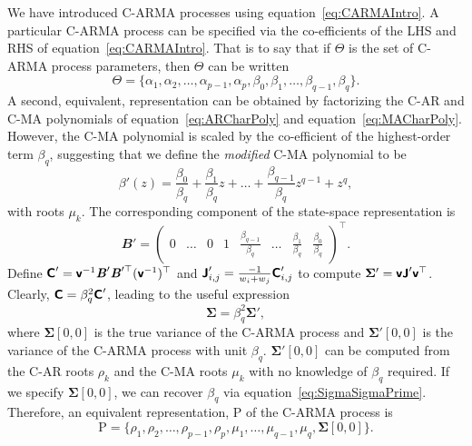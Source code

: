 \documentclass[a4paper,fleqn,usenatbib]{mnras}
\newcommand{\Rho}{\mathrm{P}}
\begin{document}
We have introduced C-ARMA processes using equation~\eqref{eq:CARMAIntro}. A particular C-ARMA process can be specified via the co-efficients of the LHS and RHS of equation~\eqref{eq:CARMAIntro}. That is to say that if $\Theta$ is the set of C-ARMA process parameters, then $\Theta$ can be written
\begin{equation}\label{eq:Theta}
\Theta = \{ \alpha_{1}, \alpha_{2}, \ldots, \alpha_{p-1}, \alpha_{p}, \beta_{0}, \beta_{1}, \ldots, \beta_{q-1}, \beta_{q} \}.
\end{equation}
A second, equivalent, representation can be obtained by factorizing the C-AR and C-MA polynomials of equation~\eqref{eq:ARCharPoly} and equation~\eqref{eq:MACharPoly}. However, the C-MA polynomial is scaled by the co-efficient of the highest-order term $\beta_{q}$, suggesting that we define the \textit{modified} C-MA polynomial to be
\begin{equation}\label{eq:modMACharPoly}
\beta'(z) = \frac{\beta_{0}}{\beta_{q}} + \frac{\beta_{1}}{\beta_{q}} z + \ldots + \frac{\beta_{q-1}}{\beta_{q}} z^{q-1} + z^{q},
\end{equation}
with roots $\mu_{k}$. The corresponding component of the state-space representation is
\begin{equation}\label{eq:BPrime}
\mathbfit{B}' = \left( \begin{array}{cccccccc} 0 & \hdots & 0 & 1 & \frac{\beta_{q-1}}{\beta_{q}} & \hdots & \frac{\beta_{1}}{\beta_{q}} & \frac{\beta_{0}}{\beta_{q}} \end{array} \right)^{\top}.
\end{equation}
Define $\textbf{\textsf{C}}' = \textbf{\textsf{v}}^{-1}\textbf{\textit{B}}'\textbf{\textit{B}}'^{\top}(\textbf{\textsf{v}}^{-1})^{\top}$ and $\textbf{\textsf{J}}'_{i,j} = \frac{ - 1}{w_{i} + w_{j}}\textbf{\textsf{C}}'_{i,j}$ to compute $\boldsymbol{\Sigma}' = \textbf{\textsf{v}}\textbf{\textsf{J}}'\textbf{\textsf{v}}^{\top}$. Clearly, $\textbf{\textsf{C}} = \beta_{q}^{2}\textbf{\textsf{C}}'$, leading to the useful expression
\begin{equation}\label{eq:SigmaSigmaPrime}
\boldsymbol{\Sigma} = \beta_{q}^{2}\boldsymbol{\Sigma}',
\end{equation}
where $\boldsymbol{\Sigma}[0,0]$ is the true variance of the C-ARMA process and $\boldsymbol{\Sigma}'[0,0]$ is the variance of the C-ARMA process with unit $\beta_{q}$. $\boldsymbol{\Sigma}'[0,0]$ can be computed from the C-AR roots $\rho_{k}$ and the C-MA roots $\mu_{k}$ with no knowledge of $\beta_{q}$ required. If we specify $\boldsymbol{\Sigma}[0,0]$, we can recover $\beta_{q}$ via equation~\eqref{eq:SigmaSigmaPrime}. Therefore, an equivalent representation, $\Rho$ of the C-ARMA process is
\begin{equation}\label{eq:Rho}
\Rho = \{ \rho_{1}, \rho_{2}, \ldots, \rho_{p-1}, \rho_{p}, \mu_{1}, \ldots, \mu_{q-1}, \mu_{q}, \boldsymbol{\Sigma}[0,0] \}.
\end{equation}
\end{document}
